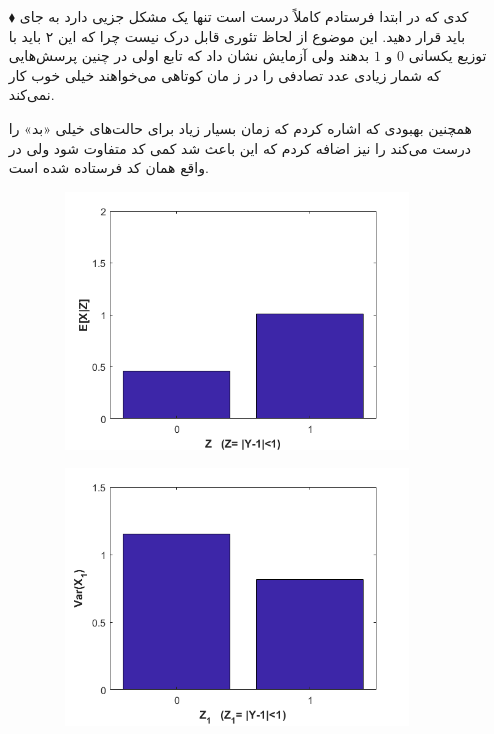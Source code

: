 \documentclass[10pt]{article}
\theoremstyle{definition}
\theoremstyle{lemma}
\theoremstyle{theorem}
\theoremstyle{remark}
\begin{document}
	\begin{itemize}
		\item[$\blacklozenge$]
		کدی که در ابتدا فرستادم کاملاً درست است تنها یک مشکل جزیی دارد به جای
		باید
		قرار دهید. این موضوع از لحاظ تئوری قابل درک نیست چرا که این ۲ باید با توزیع یکسانی
		$0$
		و
		$1$
		بدهند ولی آزمایش نشان داد که تابع اولی در چنین پرسش‌هایی که شمار زیادی عدد تصادفی را در ز
		مان کوتاهی می‌خواهند خیلی خوب کار نمی‌کند.
		
		همچنین بهبودی که اشاره کردم که زمان بسیار زیاد برای حالت‌های خیلی «بد» را درست می‌کند را نیز 
		اضافه کردم که این باعث شد کمی کد متفاوت شود ولی در واقع همان کد فرستاده شده است.
	\end{itemize}
	\begin{figure}[h!]
		\centering
		\begin{subfigure}[h!]{0.8\textwidth}
			\includegraphics[width=\textwidth]{./Images/2/1.png}
			\caption{  }
		\end{subfigure}
		\quad
		\begin{subfigure}[h!]{0.8\textwidth}
			\includegraphics[width=\textwidth]{./Images/2/2.png}
			\caption{  }
		\end{subfigure}
	\end{figure}
\end{document}
